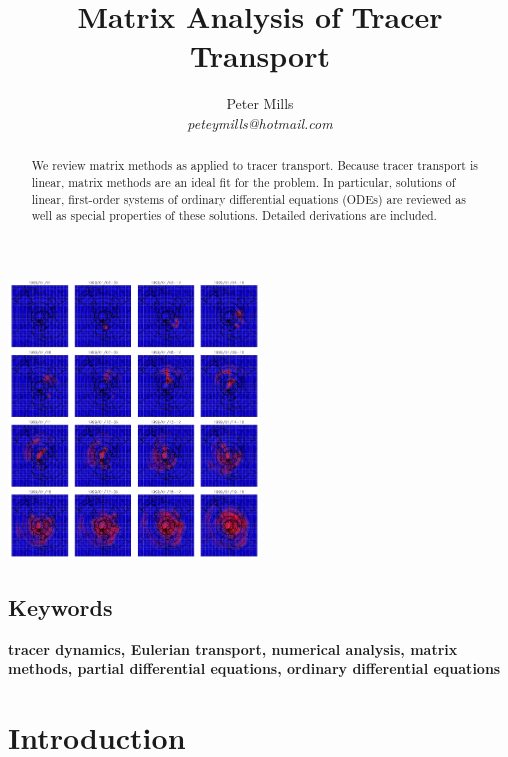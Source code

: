 \documentclass[11pt]{article}
\begin{document}
\title{Matrix Analysis of Tracer Transport}
\author{Peter Mills\\\textit{peteymills@hotmail.com}}

\maketitle

\begin{center}
\includegraphics[width=0.5\textwidth]{tt_cover_graphic}
\end{center}

\pagestyle{myheadings}

\begin{abstract}
We review matrix methods as applied to tracer transport.
Because tracer transport is linear, matrix methods are an ideal
fit for the problem.  In particular,
solutions of linear, first-order systems of ordinary differential
equations (ODEs) are reviewed as well as 
special properties of these solutions.
Detailed derivations are included.
\end{abstract}

\subsection*{Keywords}
\textbf{tracer dynamics, Eulerian transport, numerical analysis, matrix methods, partial differential equations, ordinary differential equations}

\tableofcontents

\section{Introduction}
\end{document}
